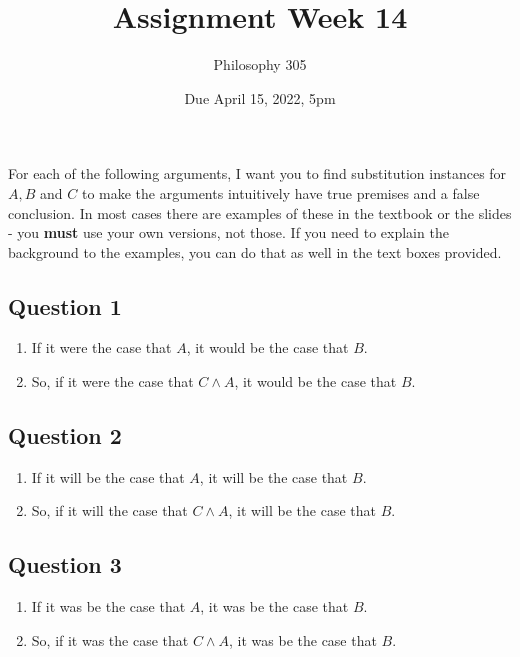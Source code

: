 \documentclass[
  11pt,
]{article}
\title{Assignment Week 14}
\author{Philosophy 305}
\date{Due April 15, 2022, 5pm}
\providecommand{\tightlist}{%
  \setlength{\itemsep}{0pt}\setlength{\parskip}{0pt}}
\begin{document}
\maketitle

For each of the following arguments, I want you to find substitution
instances for \(A, B\) and \(C\) to make the arguments intuitively have
true premises and a false conclusion. In most cases there are examples
of these in the textbook or the slides - you \textbf{must} use your own
versions, not those. If you need to explain the background to the
examples, you can do that as well in the text boxes provided.

\hypertarget{question-1}{%
\subsection{Question 1}\label{question-1}}

\begin{enumerate}
\def\labelenumi{\arabic{enumi}.}
\tightlist
\item
  If it were the case that \(A\), it would be the case that \(B\).
\item
  So, if it were the case that \(C \wedge A\), it would be the case that
  \(B\).
\end{enumerate}

\hypertarget{question-2}{%
\subsection{Question 2}\label{question-2}}

\begin{enumerate}
\def\labelenumi{\arabic{enumi}.}
\tightlist
\item
  If it will be the case that \(A\), it will be the case that \(B\).
\item
  So, if it will the case that \(C \wedge A\), it will be the case that
  \(B\).
\end{enumerate}

\hypertarget{question-3}{%
\subsection{Question 3}\label{question-3}}

\begin{enumerate}
\def\labelenumi{\arabic{enumi}.}
\tightlist
\item
  If it was be the case that \(A\), it was be the case that \(B\).
\item
  So, if it was the case that \(C \wedge A\), it was be the case that
  \(B\).
\end{enumerate}
\end{document}
